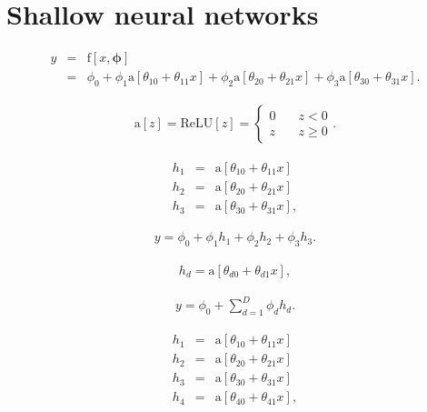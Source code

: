 \documentclass[letterpaper,twoside,openany, titlepage,oldfontcommands,titles,dvipsnames]{memoir}
\begin{document}
\chapter{Shallow neural networks}

\begin{eqnarray}\label{eq:snn_simple_eq}
 y &=& \mbox{f}[x,\boldsymbol\phi]\nonumber \\
 &=&\phi_{0}+\phi_{1}\mbox{a}[\theta_{10} + \theta_{11}x]+\phi_{2}\mbox{a}[\theta_{20} + \theta_{21}x]+\phi_{3}\mbox{a}[\theta_{30} + \theta_{31}x].
 \end{eqnarray}

\begin{eqnarray}\label{eq:snn_relu}
 \mbox{a}[z] = \mbox{ReLU}[z] = \begin{cases} 0 & \quad z <0 \\ z & \quad z\geq 0\end{cases}.
 \end{eqnarray}

\begin{eqnarray}\label{eq:snn_simple_eq1b}
 h_{1} &=& \mbox{a}[\theta_{10} + \theta_{11}x] \nonumber \\
 h_{2} &=& \mbox{a}[\theta_{20} + \theta_{21}x] \nonumber \\
 h_{3} &=& \mbox{a}[\theta_{30} + \theta_{31}x],
 \end{eqnarray}

\begin{eqnarray}\label{eq:snn_simple_eq2}
 y = \phi_{0}+\phi_{1}h_{1}+\phi_{2}h_{2}+\phi_{3}h_{3}.
 \end{eqnarray}

\begin{eqnarray}
 h_{d} = \mbox{a}[\theta_{d0} + \theta_{d1}x], 
 \end{eqnarray}

\begin{eqnarray}\label{eq:snn_many_hidden}
 y = \phi_{0}+\sum_{d=1}^{D}\phi_{d}h_{d}.
 \end{eqnarray}

\begin{eqnarray}\label{eq:snn_multiple_out2}
 h_{1} &=& \mbox{a}[\theta_{10} + \theta_{11}x] \nonumber \\
 h_{2} &=& \mbox{a}[\theta_{20} + \theta_{21}x] \nonumber \\
 h_{3} &=& \mbox{a}[\theta_{30} + \theta_{31}x] \nonumber \\
 h_{4} &=& \mbox{a}[\theta_{40} + \theta_{41}x],
 \end{eqnarray}
\end{document}
